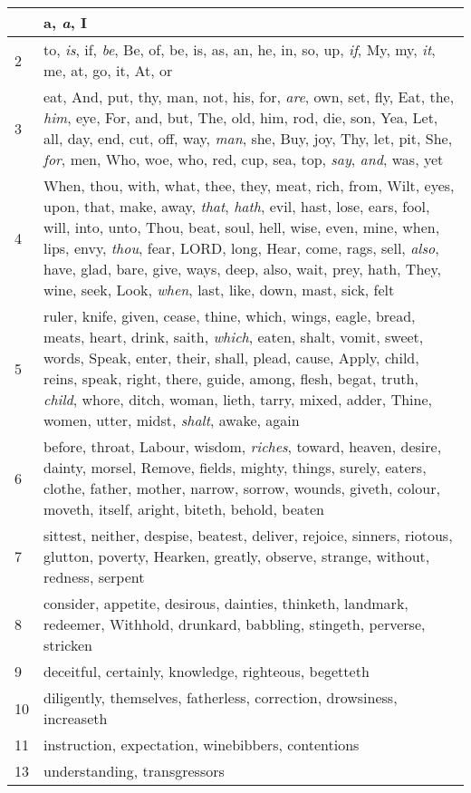 \begin{center}
\begin{longtable}{l|p{3.75in}}
\hline \hline 
\endlastfoot 
1 & a, \emph{a}, I\\ \hline 
2 & to, \emph{is}, if, \emph{be}, Be, of, be, is, as, an, he, in, so, up, \emph{if}, My, my, \emph{it}, me, at, go, it, At, or\\ \hline 
3 & eat, And, put, thy, man, not, his, for, \emph{are}, own, set, fly, Eat, the, \emph{him}, eye, For, and, but, The, old, him, rod, die, son, Yea, Let, all, day, end, cut, off, way, \emph{man}, she, Buy, joy, Thy, let, pit, She, \emph{for}, men, Who, woe, who, red, cup, sea, top, \emph{say}, \emph{and}, was, yet\\ \hline 
4 & When, thou, with, what, thee, they, meat, rich, from, Wilt, eyes, upon, that, make, away, \emph{that}, \emph{hath}, evil, hast, lose, ears, fool, will, into, unto, Thou, beat, soul, hell, wise, even, mine, when, lips, envy, \emph{thou}, fear, LORD, long, Hear, come, rags, sell, \emph{also}, have, glad, bare, give, ways, deep, also, wait, prey, hath, They, wine, seek, Look, \emph{when}, last, like, down, mast, sick, felt\\ \hline 
5 & ruler, knife, given, cease, thine, which, wings, eagle, bread, meats, heart, drink, saith, \emph{which}, eaten, shalt, vomit, sweet, words, Speak, enter, their, shall, plead, cause, Apply, child, reins, speak, right, there, guide, among, flesh, begat, truth, \emph{child}, whore, ditch, woman, lieth, tarry, mixed, adder, Thine, women, utter, midst, \emph{shalt}, awake, again\\ \hline 
6 & before, throat, Labour, wisdom, \emph{riches}, toward, heaven, desire, dainty, morsel, Remove, fields, mighty, things, surely, eaters, clothe, father, mother, narrow, sorrow, wounds, giveth, colour, moveth, itself, aright, biteth, behold, beaten\\ \hline 
7 & sittest, neither, despise, beatest, deliver, rejoice, sinners, riotous, glutton, poverty, Hearken, greatly, observe, strange, without, redness, serpent\\ \hline 
8 & consider, appetite, desirous, dainties, thinketh, landmark, redeemer, Withhold, drunkard, babbling, stingeth, perverse, stricken\\ \hline 
9 & deceitful, certainly, knowledge, righteous, begetteth\\ \hline 
10 & diligently, themselves, fatherless, correction, drowsiness, increaseth\\ \hline 
11 & instruction, expectation, winebibbers, contentions\\ \hline 
13 & understanding, transgressors\\ \hline 
\end{longtable} 
\end{center} 




 
